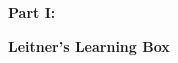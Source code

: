\vspace*{2cm}

{\bf \huge Part I:}
\vspace{1cm}

{\bf \Huge Leitner's Learning Box }
\vspace{1cm}



